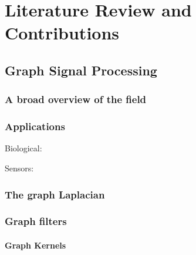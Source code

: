 \chapter{Literature Review and Contributions} %

\label{chap:lit_review} %



\section{Graph Signal Processing}


\subsection{A broad overview of the field}

\subsection{Applications}

Biological: \cite{Li2023}

Sensors: \cite{Jablonski2017}


\subsection{The graph Laplacian}

\cite{LeMagoarou2016}


\subsection{Graph filters}

\subsubsection{Graph Kernels}

\cite{Kondor2002}

\cite{Smola2003}

\cite{Zhu2003}


